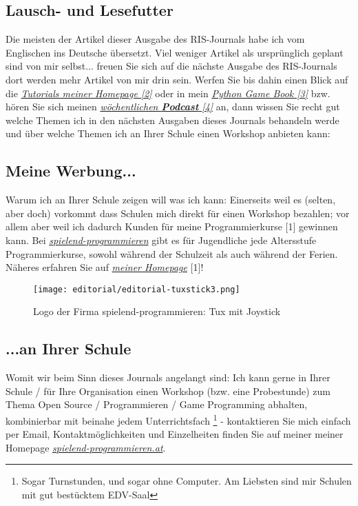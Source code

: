 \subsection*{Lausch- und Lesefutter}
Die meisten der Artikel dieser Ausgabe des RIS-Journals habe ich vom Englischen ins Deutsche übersetzt. Viel weniger Artikel als ursprünglich geplant sind von mir selbst... freuen Sie sich auf die nächste Ausgabe des RIS-Journals dort werden mehr Artikel von mir drin sein. Werfen Sie bis dahin einen Blick auf die \href{http://spielend-programmieren.at/de:tutorials:start}{\textit{Tutorials meiner Homepage [2]}} oder in mein \href{http://thepythongamebook.com}{\textit{Python Game Book [3]}} bzw. hören Sie sich meinen \href{http://biertaucher.at}{\textit{wöchentlichen \textbf{Podcast} [4]}} an, dann wissen Sie recht gut welche Themen ich in den nächsten Ausgaben dieses Journals behandeln werde und über welche Themen ich an Ihrer Schule einen Workshop anbieten kann:

\subsection*{Meine Werbung...}
Warum ich an Ihrer Schule zeigen will was ich kann: Einerseits weil es (selten, aber doch) vorkommt dass Schulen mich direkt für einen Workshop bezahlen; vor allem aber weil ich dadurch Kunden für meine Programmierkurse [1] gewinnen kann. Bei \href{http://spielend-programmieren.at}{\textit{spielend-programmieren}} gibt es für Jugendliche jede Altersstufe Programmierkurse, sowohl während der Schulzeit als auch während der Ferien. Näheres erfahren Sie auf \href{http://spielend-programmieren.at}{\textit{meiner Homepage}} [1]!

\begin{figure}
\texttt{[image: editorial/editorial-tuxstick3.png]}\\
\caption{Logo der Firma spielend-programmieren: Tux mit Joystick}
\end{figure}

\subsection*{...an Ihrer Schule}
Womit wir beim Sinn dieses Journals angelangt sind: Ich kann gerne in Ihrer Schule / für Ihre Organisation einen Workshop (bzw. eine Probestunde) zum Thema Open Source / Programmieren / Game Programming abhalten, kombinierbar mit beinahe jedem Unterrichtsfach \footnote{Sogar Turnstunden, und sogar ohne Computer. Am Liebsten sind mir Schulen mit gut bestücktem EDV-Saal} - kontaktieren Sie mich einfach per Email, Kontaktmöglichkeiten und Einzelheiten finden Sie auf meiner  meiner Homepage \href{http://spielend-programmieren.at}{\textit{spielend-programmieren.at}}.


